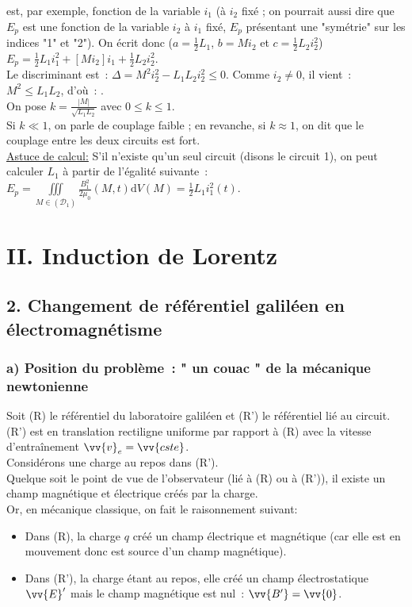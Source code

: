 \documentclass{article}
\let\oldiiint\iiint
\renewcommand{\iiint}{\oldiiint\limits}
\renewcommand\overrightarrow{\vv}
\begin{document}
est, par exemple, fonction de la variable $i_{1}$ (à $i_{2}$ fixé ;
on pourrait aussi dire que $E_{p}$ est une fonction de la variable
$i_{2}$ à $i_{1}$ fixé, $E_{p}$ présentant une "symétrie" sur les
indices "1" et "2"). On écrit donc ($a = \frac{1}{2}L_{1}$,
$b=Mi_{2}$ et $c=\frac{1}{2}L_{2}i_{2}^{2}$) $E_{p} =
\frac{1}{2}L_{1}i_{1}^{2}+\left[Mi_{2}\right]i_{1}+ \frac{1}{2}L_{2}i_{2}^{2}$.
\\
Le discriminant est : $\Delta = M^{2}i_{2}^{2}-L_{1}L_{2}i_{2}^{2}
\leq 0$. Comme $i_{2} \neq 0$, il vient : $M^{2} \leq L_{1}L_{2}$,
d'où : . \\
On pose $k = \frac{|M|}{\sqrt{L_{1}L_{2}}}$ avec $0 \leq k \leq 1$.
\\
Si $k\ll 1$, on parle de couplage faible ; en revanche, si $k \approx
1$, on dit que le couplage entre les deux circuits est fort. \\
\underline{Astuce de calcul:} S'il n'existe qu'un seul circuit
(disons le circuit 1), on peut calculer $L_{1}$ à partir de
l'égalité suivante : $E_{p} = \iiint_{M\in
\left(\mathcal{D}_{1}\right)}\frac{B_{1}^{2}}{2\mu_{0}}(M,t)\mathrm{d}V(M)=\frac{1}{2}L_{1}i_{1}^{2}(t)$.

\section*{II. Induction de Lorentz}
\subsection*{2. Changement de référentiel galiléen en électromagnétisme}
\subsubsection*{a) Position du problème : " un couac " de la mécanique
newtonienne}
Soit (R) le référentiel du laboratoire galiléen et (R') le
référentiel lié au circuit. (R') est en translation rectiligne
uniforme par rapport à
(R) avec la vitesse d'entraînement $\overrightarrow{v}_{e}=\overrightarrow{cste}$. \\
Considérons une charge au repos dans (R').\\
Quelque soit le point de vue de l'observateur (lié à (R) ou à (R')),
il existe un champ magnétique et électrique créés par la charge. \\
Or, en mécanique classique, on fait le raisonnement suivant:
\begin{itemize}
\item Dans (R), la charge $q$ créé un champ électrique et magnétique
(car elle est en mouvement donc est source d'un champ magnétique).
\item Dans (R'), la charge étant au repos, elle créé un champ
électrostatique $\overrightarrow{E}'$ mais le champ magnétique est
nul : $\overrightarrow{B'}  = \overrightarrow{0}$.
\end{itemize}
\end{document}
